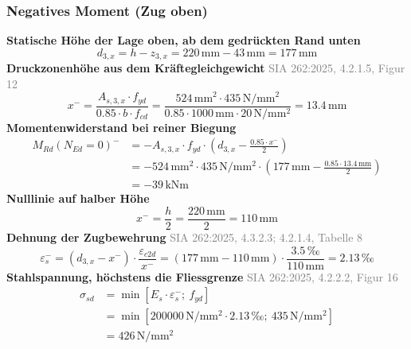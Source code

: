\documentclass[11pt,a4paper]{article}
\newcommand{\normref}[1]{{\small\textcolor{gray}{#1}}}
\begin{document}
\subsubsection{Negatives Moment (Zug oben)}
\noindent\textbf{Statische Höhe der Lage oben, ab dem gedrückten Rand unten}
\begin{equation*}
d_{3,x} = h - z_{3,x} = 220\,\mathrm{mm} - 43\,\mathrm{mm} = 177\,\mathrm{mm}
\end{equation*}
\noindent\textbf{Druckzonenhöhe aus dem Kräftegleichgewicht} \hfill \normref{SIA 262:2025, 4.2.1.5, Figur 12}
\begin{equation*}
x^{-} = \frac{A_{s,3,x} \cdot f_{yd}}{0.85 \cdot b \cdot f_{cd}} = \frac{524\,\mathrm{mm}^{2} \cdot 435\,\mathrm{N}/\mathrm{mm}^{2}}{0.85 \cdot 1000\,\mathrm{mm} \cdot 20\,\mathrm{N}/\mathrm{mm}^{2}} = 13.4\,\mathrm{mm}
\end{equation*}
\noindent\textbf{Momentenwiderstand bei reiner Biegung}
\begin{equation*}
\begin{aligned}
  M_{Rd}(N_{Ed}=0)^{-} &= -A_{s,3,x} \cdot f_{yd} \cdot \left(d_{3,x} - \frac{0.85 \cdot x^{-}}{2}\right) \\
  &= -524\,\mathrm{mm}^{2} \cdot 435\,\mathrm{N}/\mathrm{mm}^{2} \cdot \left(177\,\mathrm{mm} - \frac{0.85 \cdot 13.4\,\mathrm{mm}}{2}\right) \\
  &= -39\,\mathrm{kNm}
\end{aligned}
\end{equation*}
\noindent\textbf{Nulllinie auf halber Höhe}
\begin{equation*}
x^{-} = \frac{h}{2} = \frac{220\,\mathrm{mm}}{2} = 110\,\mathrm{mm}
\end{equation*}
\noindent\textbf{Dehnung der Zugbewehrung} \hfill \normref{SIA 262:2025, 4.3.2.3; 4.2.1.4, Tabelle 8}
\begin{equation*}
\varepsilon_s^{-} = \left(d_{3,x} - x^{-}\right) \cdot \frac{\varepsilon_{c2d}}{x^{-}} = \left(177\,\mathrm{mm} - 110\,\mathrm{mm}\right) \cdot \frac{3.5\,\text{‰}}{110\,\mathrm{mm}} = 2.13\,\text{‰}
\end{equation*}
\noindent\textbf{Stahlspannung, höchstens die Fliessgrenze} \hfill \normref{SIA 262:2025, 4.2.2.2, Figur 16}
\begin{equation*}
\begin{aligned}
  \sigma_{sd} &= \min\left[E_s \cdot \varepsilon_s^{-};\ f_{yd}\right] \\
  &= \min\left[200000\,\mathrm{N}/\mathrm{mm}^{2} \cdot 2.13\,\text{‰};\ 435\,\mathrm{N}/\mathrm{mm}^{2}\right] \\
  &= 426\,\mathrm{N}/\mathrm{mm}^{2}
\end{aligned}
\end{equation*}
\end{document}
